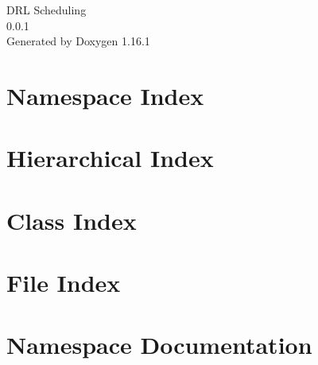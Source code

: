 \documentclass[twoside]{book}
\newcommand{\+}{\discretionary{\mbox{\scriptsize$\hookleftarrow$}}{}{}}
\newcommand{\clearemptydoublepage}{%
    \newpage{\pagestyle{empty}\cleardoublepage}%
  }
\begin{document}
  \raggedbottom
    \hypersetup{pageanchor=false,
                bookmarksnumbered=true,
                pdfencoding=unicode
               }
  \begin{titlepage}
  \vspace*{7cm}
  \begin{center}%
  {\Large DRL Scheduling}\\
  [1ex]\large 0.\+0.\+1 \\
  \vspace*{1cm}
  {\large Generated by Doxygen 1.16.1}\\
  \end{center}
  \end{titlepage}
  \clearemptydoublepage
  \tableofcontents
  \clearemptydoublepage
  \hypersetup{pageanchor=true}
\chapter{Namespace Index}

\chapter{Hierarchical Index}

\chapter{Class Index}

\chapter{File Index}

\chapter{Namespace Documentation}















\end{document}
